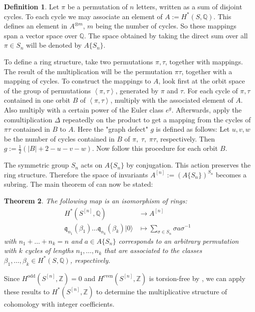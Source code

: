 \documentclass{amsart}
\newcommand{\hilb}[1]{^{[#1]}}
\newcommand{\vac}{|0\rangle}
\newcommand{\IQ}{\mathbb{Q}}
\newcommand{\IZ}{\mathbb{Z}}
\newcommand{\kq}{\mathfrak{q}}
\theoremstyle{plain}
\newtheorem{theorem}{Theorem}[section]
\theoremstyle{definition}
\newtheorem{definition}[theorem]{Definition}
\theoremstyle{remark}
\begin{document}
\begin{definition} \cite[Sect. 2]{LehnSorger}
Let $\pi$ be a permutation of $n$ letters, written as a sum of disjoint cycles. To each cycle we may associate an element of $A:=H^\ast(S,\IQ)$. This defines an element in $A^{\otimes m}$, $m$ being the number of cycles. So these mappings span a vector space over $\IQ$. The space obtained by taking the direct sum over all $\pi \in S_n$ will be denoted by $A\{S_n\}$. 

To define a ring structure, take two permutations $\pi,\tau$, together with mappings. The result of the multiplication will be the permutation $\pi\tau$, together with a mapping of cycles. To construct the mappings to $A$, look first at the orbit space of the group of permutations $\left<\pi,\tau\right>$, generated by $\pi$ and $\tau$. For each cycle of $\pi, \tau$ contained in one orbit $B$ of $\left<\pi,\tau\right>$, multiply with the associated element of $A$. Also multiply with a certain power of the Euler class $e^g$. 
Afterwards, apply the comultiplication $\Delta$ repeatedly on the product to get a mapping from the cycles of $\pi\tau$ contained in $B$ to $A$. 
Here the "graph defect" $g$ is defined as follows: Let $u,v,w$ be the number of cycles contained in $B$ of $\pi,\;\tau,\;\pi\tau$, respectively. Then $g:=\frac{1}{2}\left(|B| + 2- u-v-w\right)$. Now follow this procedure for each orbit $B$. 

\end{definition}
The symmetric group $S_n$ acts on $A\{S_n\}$ by conjugation. This action preserves the ring structure. Therefore the space of invariants $A\hilb{n} := \left(A\{S_n\} \right)^{S_n}$ becomes a subring. The main theorem of \cite{LehnSorger} can now be stated:
\begin{theorem} \cite[Thm. 3.2.]{LehnSorger}
The following map is an isomorphism of rings:
\begin{align*}
H^\ast(S\hilb{n},\IQ) & \longrightarrow A\hilb{n} \\
\kq_{n_1}(\beta_1)\ldots \kq_{n_k}(\beta_k) \vac &\longmapsto \sum_{\sigma\in S_n} \sigma a \sigma^{{-}1} 
\end{align*}
with $n_1+\ldots + n_k =n$ and $a\in A\{S_n\} $ corresponds to an arbitrary permutation with $k$ cycles of lengths $n_1,\ldots,n_k$ that are associated to the classes $\beta_1,\ldots,\beta_k \in H^\ast(S,\IQ)$, respectively.
\end{theorem}

Since $H^\text{odd}(S\hilb{n},\IZ) = 0$ and $H^\text{even}(S\hilb{n},\IZ)$ is torsion-free by \cite{Markman}, we can apply these results to $H^\ast(S\hilb{n}, \IZ)$ to determine the multiplicative structure of cohomology with integer coefficients.
\end{document}
